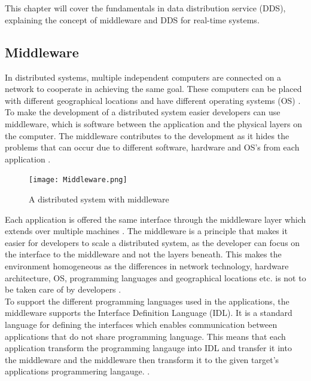 \documentclass[Main]{subfiles}
\begin{document}
\chapter{}
This chapter will cover the fundamentals in data distribution service (DDS), explaining the concept of middleware and DDS for real-time systems.
\\
\section{Middleware}
In distributed systems, multiple independent computers are connected on a network to cooperate in achieving the same goal. 
These computers can be placed with different geographical locations and have different operating systems (OS) \cite[p. 2]{Tanenbaum}.
\\ 
To make the development of a distributed system easier developers can use middleware, which is software between the application and the physical layers on the computer. 
The middleware contributes to the development as it hides the problems that can occur due to different software, hardware and OS's from each application \cite[p. 3]{Tanenbaum}.

\begin{figure}[H]
\centering
\texttt{[image: Middleware.png]}
\caption{A distributed system with middleware \cite[p. 3]{Tanenbaum}}
\label{Fig:Middleware}
\end{figure}

Each application is offered the same interface through the middleware layer which extends over multiple machines \cite[p. 3]{Tanenbaum}. The middleware is a principle that makes it easier for developers to scale a distributed system, as the developer can focus on the interface to the middleware and not the layers beneath. This makes the environment homogeneous as the differences in network technology, hardware architecture, OS, programming languages and geographical locations etc. is not to be taken care of by developers \cite{DDS-slides} \cite[p. 68]{Coulouris}.
\\
To support the different programming languages used in the applications, the middleware supports the Interface Definition Language (IDL). It is a standard language for defining the interfaces which enables communication between applications that do not share programming language. This means that each application transform the programming langauge into IDL and transfer it into the middleware and the middleware then transform it to the given target's applications programmering langauge. \cite{DDS-slides} \cite{RTI} \cite{wiki-idl}.
\end{document}
